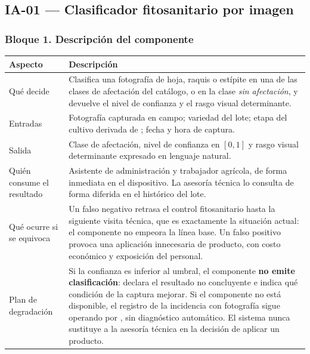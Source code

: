 \subsection{IA-01 --- Clasificador fitosanitario por imagen}

\subsubsection*{Bloque 1. Descripción del componente}

\begin{table}[H]
\centering\footnotesize
\begin{tabular}{|L{3.6cm}|L{11.8cm}|}
\hline
{}\textbf{Aspecto} & \textbf{Descripción}\\ \hline
Qué decide & Clasifica una fotografía de hoja, raquis o estípite en una de las clases de afectación del catálogo, o en la clase \emph{sin afectación}, y devuelve el nivel de confianza y el rasgo visual determinante.\\ \hline
Entradas & Fotografía capturada en campo; variedad del lote; etapa del cultivo derivada de ; fecha y hora de captura.\\ \hline
Salida & Clase de afectación, nivel de confianza en $[0,1]$ y rasgo visual determinante expresado en lenguaje natural.\\ \hline
Quién consume el resultado & Asistente de administración y trabajador agrícola, de forma inmediata en el dispositivo. La asesoría técnica lo consulta de forma diferida en el histórico del lote.\\ \hline
Qué ocurre si se equivoca & Un falso negativo retrasa el control fitosanitario hasta la siguiente visita técnica, que es exactamente la situación actual: el componente no empeora la línea base. Un falso positivo provoca una aplicación innecesaria de producto, con costo económico y exposición del personal.\\ \hline
Plan de degradación & Si la confianza es inferior al umbral, el componente \textbf{no emite clasificación}: declara el resultado no concluyente e indica qué condición de la captura mejorar. Si el componente no está disponible, el registro de la incidencia con fotografía sigue operando por , sin diagnóstico automático. El sistema nunca sustituye a la asesoría técnica en la decisión de aplicar un producto.\\ \hline
\end{tabular}
\end{table}

